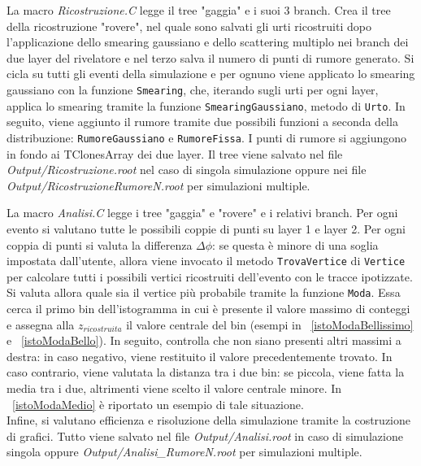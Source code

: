 \documentclass[11pt,a4paper]{article}
\begin{document}
\par La macro \textit{Ricostruzione.C} legge il tree "gaggia" e i suoi 3 branch. Crea il tree della ricostruzione "rovere", nel quale sono salvati gli urti ricostruiti dopo l'applicazione dello smearing gaussiano e dello scattering multiplo nei branch dei due layer del rivelatore e nel terzo salva il numero di punti di rumore generato.
Si cicla su tutti gli eventi della simulazione e per ognuno viene applicato lo smearing gaussiano con la funzione \lstinline{Smearing}, che, iterando sugli urti per ogni layer, applica lo smearing tramite la funzione \lstinline{SmearingGaussiano}, metodo di \lstinline{Urto}. In seguito, viene aggiunto il rumore tramite due possibili funzioni a seconda della distribuzione: \lstinline{RumoreGaussiano} e \lstinline{RumoreFissa}. I punti di rumore si aggiungono in fondo ai TClonesArray dei due layer. Il tree viene salvato nel file \textit{Output/Ricostruzione.root} nel caso di singola simulazione oppure nei file \textit{Output/RicostruzioneRumoreN.root} per simulazioni multiple.\\

\par La macro \textit{Analisi.C} legge i tree "gaggia" e "rovere" e i relativi branch. Per ogni evento si valutano tutte le possibili coppie di punti su layer 1 e layer 2. Per ogni coppia di punti si valuta la differenza $\Delta\phi$: se questa è minore di una soglia impostata dall'utente, allora viene invocato il metodo \lstinline{TrovaVertice} di \lstinline{Vertice} per calcolare tutti i possibili vertici ricostruiti dell'evento con le tracce ipotizzate.
Si valuta allora quale sia il vertice più probabile tramite la funzione \lstinline{Moda}. Essa cerca il primo bin dell'istogramma in cui è presente il valore massimo di conteggi e assegna alla $z_{ricostruita}$ il valore centrale del bin (esempi in \figurename~\ref{istoModaBellissimo} e \figurename~\ref{istoModaBello}). In seguito, controlla che non siano presenti altri massimi a destra: in caso negativo, viene restituito il valore precedentemente trovato. In caso contrario, viene valutata la distanza tra i due bin: se piccola, viene fatta la media tra i due, altrimenti viene scelto il valore centrale minore. In \figurename~\ref{istoModaMedio} è riportato un esempio di tale situazione.\\
Infine, si valutano efficienza e risoluzione della simulazione tramite la costruzione di grafici. Tutto viene salvato nel file \textit{Output/Analisi.root} in caso di simulazione singola oppure \textit{Output/Analisi\_RumoreN.root} per simulazioni multiple.
\end{document}

